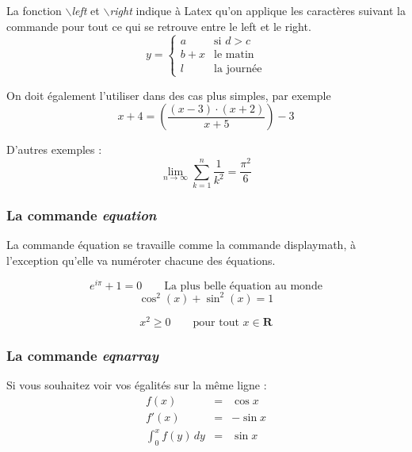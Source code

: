\documentclass[12pt,twoside,a4paper]{article}
\begin{document}
	\noindent La fonction \textit{$\backslash$left} et \textit{$\backslash$right} indique à Latex qu'on applique les caractères suivant la commande pour tout ce qui se retrouve entre le left et le right. 
	\begin{displaymath}
		y = \left\{ \begin{array}{ll}
			a & \textrm{si $d>c$}\\
			b+x & \textrm{le matin}\\
			l & \textrm{la journée}
		\end{array} \right.
	\end{displaymath}
	
	\noindent On doit également l'utiliser dans des cas plus simples, par exemple
	\begin{displaymath}
		x+4 = \left(\frac{(x-3)\cdot(x+2)}{x+5}\right)-3
	\end{displaymath}
	
	D'autres exemples : 
	\begin{displaymath}
		\lim_{n \to \infty}
		\sum_{k=1}^n \frac{1}{k^2}
		= \frac{\pi^2}{6}
	\end{displaymath}
	
	\subsubsection{La commande \textit{equation}}
	La commande équation se travaille comme la commande displaymath, à l'exception qu'elle va numéroter chacune des équations. 
	
	\begin{equation}
		e^{i\pi}+1=0 \qquad \textrm{La plus belle équation au monde} %
	\end{equation}
	\begin{equation} \label{eq} %
		\cos^2(x)+\sin^2(x)=1 
	\end{equation}
	
	\begin{equation}
		x^{2} \geq 0\qquad
		\textrm{pour tout }
		x\in\mathbf{R}
	\end{equation}
	
	\subsubsection{La commande \textit{eqnarray}}
	
	
	Si vous souhaitez voir vos égalités sur la même ligne  : 
	\begin{eqnarray}
		f(x) & = & \cos x \nonumber\\ %
		f'(x) & = & -\sin x \\
		\int_{0}^{x} f(y)\,dy &
		= & \sin x
	\end{eqnarray}
	
\end{document}
